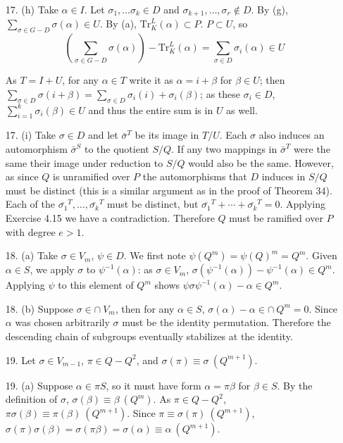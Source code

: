 \documentclass{article}
\newcommand{\modequiv}[3]{#1 \equiv #2\ (#3)}
\begin{document}
\begin{enumerate}
\item[17. (h)] Take $\alpha \in I$.  Let $\sigma_1, \ldots \sigma_k \in D$ and $\sigma_{k+1}, \ldots, \sigma_{r} \not \in D$.  By (g), $\sum_{\sigma \in G - D} \sigma(\alpha) \in U$. By (a), $\text{Tr}^{L}_{K}(\alpha) \subset P$.  $P \subset U$, so \[\left(\sum_{\sigma \in G - D} \sigma(\alpha)\right ) - \text{Tr}^{L}_{K}(\alpha) = \sum_{\sigma \in D}\sigma_{i}(\alpha) \in U \]

As $T = I + U$, for any $\alpha \in T$ write it as $\alpha = i + \beta$ for $\beta \in U$; then $\sum_{\sigma \in D} \sigma(i + \beta) = \sum_{\sigma \in D}  \sigma_i(i) + \sigma_i(\beta)$; as these $\sigma_i \in D$, $\sum_{i=1}^{k} \sigma_i(\beta) \in U$ and thus the entire sum is in $U$ as well.

\item[17. (i)] Take $\sigma \in D$ and let $\bar{\sigma}^{T}$ be its image in $T/U$.  Each $\sigma$ also induces an automorphism $\bar{\sigma}^{S}$ to the quotient $S/Q$.  If any two mappings in $\bar{\sigma}^{T}$ were the same their image under reduction to $S/Q$ would also be the same.  However, as since $Q$ is unramified over $P$ the automorphisms that $D$ induces in $S/Q$ must be distinct (this is a similar argument as in the proof of Theorem 34).  Each of the $\bar{\sigma_1}^{T}, \ldots, \bar{\sigma_k}^{T}$ must be distinct, but $\bar{\sigma_1}^{T} + \cdots + \bar{\sigma_k}^{T} = 0$.  Applying Exercise 4.15 we have a contradiction.  Therefore $Q$ must be ramified over $P$ with degree $e > 1$.

\item[18. (a)] Take $\sigma \in V_m$, $\psi \in D$.  We first note $\psi(Q^m) = \psi(Q)^m = Q^m$.  Given $\alpha \in S$, we apply $\sigma$ to $\psi^{-1}(\alpha)$: as $\sigma \in V_m$, $\sigma(\psi^{-1}(\alpha)) - \psi^{-1}(\alpha) \in Q^{m}$.  Applying $\psi$ to this element of $Q^{m}$ shows $\psi\sigma\psi^{-1}(\alpha) - \alpha \in Q^{m}$.

\item[18. (b)]  Suppose $\sigma \in \cap\ V_{m}$, then for any $\alpha \in S$, $\sigma(\alpha) - \alpha \in \cap\ Q^{m} = 0$.  Since $\alpha$ was chosen arbitrarily $\sigma$ must be the identity permutation.  Therefore the descending chain of subgroups eventually stabilizes at the identity.

\item[19.] Let $\sigma \in V_{m-1}$, $\pi \in Q - Q^2$, and $\modequiv{\sigma(\pi)}{\sigma}{Q^{m+1}}$.

\item[19. (a)] Suppose $\alpha \in \pi S$, so it must have form $\alpha = \pi \beta$ for $\beta \in S$.  By the definition of $\sigma$, $\modequiv{\sigma(\beta)}{\beta}{Q^{m}}$.  As $\pi \in Q - Q^{2}$, $\modequiv{\pi\sigma(\beta)}{\pi(\beta)}{Q^{m+1}}$.  Since $\modequiv{\pi}{\sigma(\pi)}{Q^{m+1}}$, $\modequiv{\sigma(\pi)\sigma(\beta) = \sigma(\pi\beta) = \sigma(\alpha)}{\alpha}{Q^{m+1}}$.


\end{enumerate}
\end{document}
